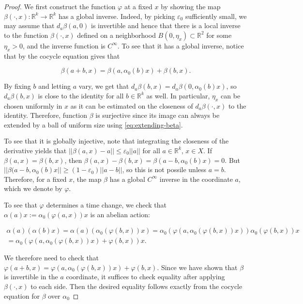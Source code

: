 \documentclass[10pt,a4paper]{amsart}
\newcommand{\R}{\mathbb{R}}
\newcommand{\id}{\mathrm{Id}}
\newcommand{\norm}[1]{{\left|\left| #1 \right|\right|}}
\newcommand{\ve}{\varepsilon}
\begin{document}
\begin{proof}
We first construct the function $\varphi$ at a fixed $x$ by showing the map $\beta( \cdot,x) : \R^k \to \R^k$ has a global inverse. Indeed, by picking $\ve_0$ sufficiently small, we may assume that $d_{ a}\beta(a,0)$ is invertible and hence that there is a local inverse to the function $\beta(\cdot,x)$ defined on a neighborhood $B(0,\eta_x) \subset \R^2$ for some $\eta_x > 0$, and the inverse function is $C^\infty$. %
To see that it has a global inverse, notice that by the cocycle equation gives that 

\begin{equation}
\label{eq:extending-beta}
\beta(a+b,x) = \beta(a,\alpha_0(b)x) + \beta(b,x).
\end{equation}

 By fixing $b$ and letting $a$ vary, we get that $d_a\beta(b,x) = d_a\beta(0,\alpha_0(b)x)$, so $d_a\beta(b,x)$ is close to the identity for all $b \in \R^k$ as well. In particular, $\eta_x$ can be chosen uniformly in $x$ {  as it can be estimated on the closeness of $d_a\beta(\cdot,x)$ to the identity. Therefore, function $\beta$ is surjective   since its image can always be extended by a ball of uniform size using \eqref{eq:extending-beta}.}

To see that it is globally injective, note that integrating the closeness of the derivative yields that $\norm{\beta(a,x)-a} \le \ve_0\norm{a}$ for all $ a \in \R^k$, $x \in X$. If $\beta(a,x) = \beta(b,x)$, then $\beta(a,x) - \beta(b,x) = \beta(a-b,\alpha_0(b)x) = 0$. But $\norm{\beta(a-b,\alpha_0(b)x} \ge (1-\ve_0)\norm{a-b}$, so this is not possile unless $a = b$. Therefore, for a fixed $x$, the map $\beta$ has a global $C^\infty$ inverse in the coordinate $a$, which we denote by $\varphi$.

To see that $\varphi$ determines a time change, we check that $\alpha(a)x := \alpha_0(\varphi(a,x))x$ is an abelian action:

\begin{multline*} \alpha(a)(\alpha(b)x) = \alpha(a)( \alpha_0(\varphi(b,x))x ) = \alpha_0(\varphi(a,\alpha_0(\varphi(b,x))x))\alpha_0(\varphi(b,x))x \\
 = \alpha_0( \varphi(a,\alpha_0(\varphi(b,x))x)+\varphi(b,x)) x.
 \end{multline*}

We therefore need to check that $\varphi(a+b,x) = \varphi(a,\alpha_0(\varphi(b,x))x)+\varphi(b,x)$. Since we have shown that $\beta$ is invertible in the $a$ coordinate, it suffices to check equality { after} applying $\beta(\cdot,x)$ to each side. Then the desired equality follows exactly from the cocycle equation for $\beta$ over $\alpha_0$


\end{proof}
\end{document}
